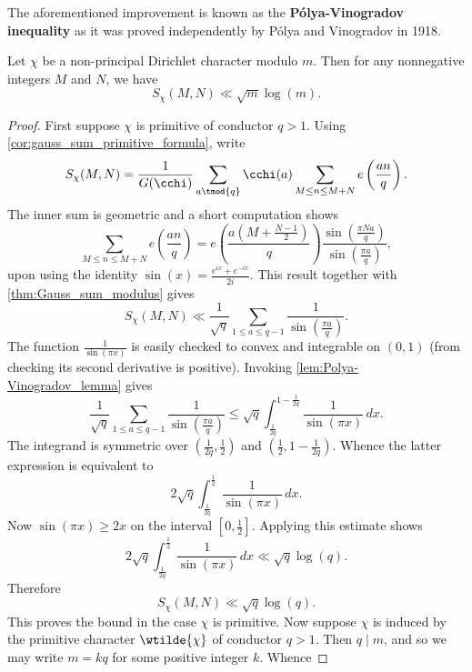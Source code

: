 \documentclass[12pt]{article}
\begin{document}
     The aforementioned improvement is known as the \textbf{P\'olya-Vinogradov inequality} as it was proved independently by P\'olya and Vinogradov in 1918.

      \begin{theorem*}
        Let \(\chi\) be a non-principal Dirichlet character modulo \(m\). Then for any nonnegative integers \(M\) and \(N\), we have
        \[
          S_{\chi}(M,N) \ll \sqrt{m}\log(m).
        \]
      \end{theorem*}
      \begin{proof}
        First suppose \(\chi\) is primitive of conductor \(q > 1\). Using \cref{cor:gauss_sum_primitive_formula}, write
        \[
          S_{\chi}(M,N) = \frac{1}{G(\cchi)}\sum_{a \tmod{q}}\cchi(a)\sum_{M \le n \le M+N}e\left(\frac{an}{q}\right).
        \]
        The inner sum is geometric and a short computation shows
        \[
          \sum_{M \le n \le M+N}e\left(\frac{an}{q}\right) = e\left(\frac{a\left(M+\frac{N-1}{2}\right)}{q}\right)\frac{\sin\left(\frac{\pi Na}{q}\right)}{\sin\left(\frac{\pi a}{q}\right)},
        \]
        upon using the identity \(\sin(x) = \frac{e^{ix}+e^{-ix}}{2i}\). This result together with \cref{thm:Gauss_sum_modulus} gives
        \[
          S_{\chi}(M,N) \ll \frac{1}{\sqrt{q}}\sum_{1 \le a \le q-1}\frac{1}{\sin\left(\frac{\pi a}{q}\right)}.
        \]
        The function \(\frac{1}{\sin(\pi x)}\) is easily checked to convex and integrable on \((0,1)\) (from checking its second derivative is positive). Invoking \cref{lem:Polya-Vinogradov_lemma} gives
        \[
          \frac{1}{\sqrt{q}}\sum_{1 \le a \le q-1}\frac{1}{\sin\left(\frac{\pi a}{q}\right)} \le \sqrt{q}\int_{\frac{1}{2q}}^{1-\frac{1}{2q}}\frac{1}{\sin(\pi x)}\,dx.
        \]
        The integrand is symmetric over \(\left(\frac{1}{2q},\frac{1}{2}\right)\) and \(\left(\frac{1}{2},1-\frac{1}{2q}\right)\). Whence the latter expression is equivalent to
        \[
          2\sqrt{q}\int_{\frac{1}{2q}}^{\frac{1}{2}}\frac{1}{\sin(\pi x)}\,dx.
        \]
        Now \(\sin(\pi x) \ge 2x\) on the interval \([0,\frac{1}{2}]\). Applying this estimate shows
        \[
          2\sqrt{q}\int_{\frac{1}{2q}}^{\frac{1}{2}}\frac{1}{\sin(\pi x)}\,dx \ll \sqrt{q}\log(q).
        \]
        Therefore
        \[
          S_{\chi}(M,N) \ll \sqrt{q}\log(q).
        \]
        This proves the bound in the case \(\chi\) is primitive. Now suppose \(\chi\) is induced by the primitive character \(\wtilde{\chi}\) of conductor \(q > 1\). Then \(q \mid m\), and so we may write \(m = kq\) for some positive integer \(k\). Whence

\end{proof}
\end{document}
